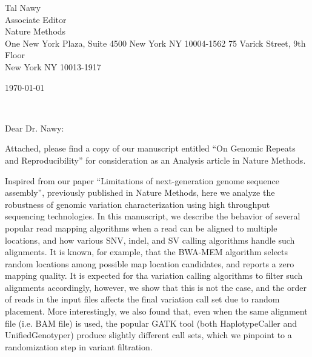\documentclass[10pt]{article}
\begin{document}
\thispagestyle{empty}

\vspace*{0.7cm}

\begin{minipage}{0.49\textwidth}
\begin{flushleft}
  \noindent Tal Nawy\\
Associate Editor\\
Nature Methods\\
One New York Plaza, Suite 4500
New York NY 10004-1562
75 Varick Street, 9th Floor\\
New York NY 10013-1917
\end{flushleft}
\end{minipage}
\begin{minipage}{0.47\textwidth}
\begin{flushright}
\today
\end{flushright}
\end{minipage} \\

\vspace*{0.7cm}  

Dear Dr. Nawy:

Attached, please find a copy of our manuscript entitled ``On Genomic Repeats and Reproducibility''
for consideration as an Analysis article in Nature Methods.

Inspired from our paper ``Limitations of next-generation genome sequence assembly'', previously published in Nature Methods, here we analyze the robustness of genomic variation characterization 
using high throughput sequencing technologies.
In this manuscript, we describe the behavior of several popular read mapping algorithms when a read can be aligned to multiple locations, and how various SNV, indel, and SV calling algorithms 
handle such alignments. It is known, for example, that the BWA-MEM algorithm selects random locations among possible map location candidates, and reports a zero mapping quality. It is expected
for tha variation calling algorithms to filter such alignments accordingly, however, we show that this is not the case, and the order of reads in the input files affects the 
final variation call set due to random placement. More interestingly, we also found that, even when the same alignment file (i.e. BAM file) is used, the popular GATK tool (both HaplotypeCaller and UnifiedGenotyper) produce slightly different call sets, which we pinpoint to a randomization step in variant filtration.
\end{document}
